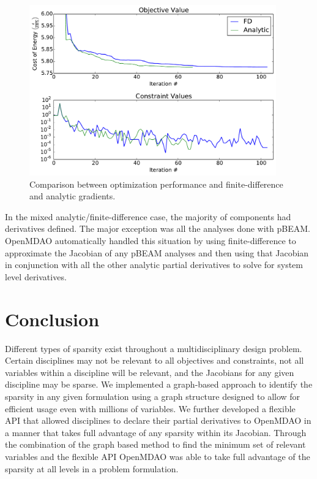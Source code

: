 \documentclass[]{aiaa-tc} %
\begin{document}
        \begin{figure}[!htbp]
          \centering
          \includegraphics[width=0.95\textwidth]{images/wt_opt_progress}
          \caption{Comparison between optimization performance and finite-difference and analytic gradients.}
          \label{fig:wt-opt-progress}
        \end{figure}

        In the mixed analytic/finite-difference case, the majority of components had derivatives defined. The major 
        exception was all the analyses done with pBEAM. OpenMDAO automatically handled this situation by using finite-difference 
        to approximate the Jacobian of any pBEAM analyses and then using that Jacobian in conjunction with all the other 
        analytic partial derivatives to solve for system level derivatives. 
        

  \section{Conclusion}

      Different types of sparsity exist throughout a multidisciplinary design problem. Certain 
      disciplines may not be relevant to all objectives and constraints, not all variables within a discipline will 
      be relevant, and the Jacobians for any given discipline may be sparse. We implemented a graph-based 
      approach to identify the sparsity in any given formulation using a graph structure designed to allow for 
      efficient usage even with millions of variables. We further developed a flexible API 
      that allowed disciplines to declare their partial derivatives to OpenMDAO in a manner that 
      takes full advantage of any sparsity within its Jacobian. Through the combination of the graph based 
      method to find the minimum set of relevant variables and the flexible API OpenMDAO was able to take full 
      advantage of the sparsity at all levels in a problem formulation.
\end{document}
